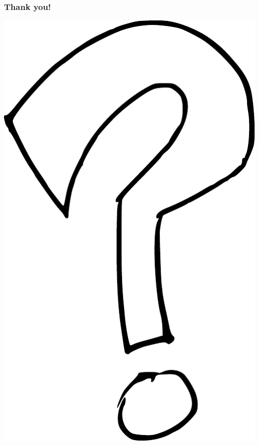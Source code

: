 
\begin{frame}
  \frametitle{Thank you!}
  \vskip 1cm
  \begin{center}
    \includegraphics[scale=0.2]{figures/question_mark.pdf}

\end{center}
\end{frame}
